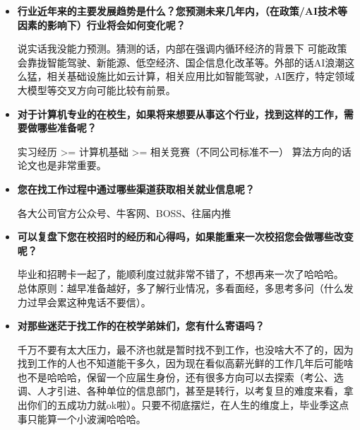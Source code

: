 \begin{itemize}
    \item \textbf{行业近年来的主要发展趋势是什么？您预测未来几年内，（在政策/AI技术等因素的影响下）行业将会如何变化呢？}

说实话我没能力预测。猜测的话，内部在强调内循环经济的背景下
可能政策会靠拢智能驾驶、新能源、低空经济、国企信息化改革等。外部的话AI浪潮这么猛，相关基础设施比如云计算，相关应用比如智能驾驶，AI医疗，特定领域大模型等交叉方向可能比较有前景。

    \item \textbf{对于计算机专业的在校生，如果将来想要从事这个行业，找到这样的工作，需要做哪些准备呢？}

实习经历 >= 计算机基础 >= 相关竞赛（不同公司标准不一）
算法方向的话论文也是非常重要。

    \item \textbf{您在找工作过程中通过哪些渠道获取相关就业信息呢？}

各大公司官方公众号、牛客网、BOSS、往届内推

    \item \textbf{可以复盘下您在校招时的经历和心得吗，如果能重来一次校招您会做哪些改变呢？}

毕业和招聘卡一起了，能顺利度过就非常不错了，不想再来一次了哈哈哈。
总体原则：越早准备越好，多了解行业情况，多看面经，多思考多问（什么发力过早会累这种鬼话不要信）。

    \item \textbf{对那些迷茫于找工作的在校学弟妹们，您有什么寄语吗？}

千万不要有太大压力，最不济也就是暂时找不到工作，也没啥大不了的，因为找到工作的人也不知道能干多久，因为现在看似高薪光鲜的工作几年后可能啥也不是哈哈哈，保留一个应届生身份，还有很多方向可以去探索（考公、选调、人才引进、各种单位的信息部门，甚至是转行，以考复旦的难度来看，拿出你们的五成功力就ok啦）。只要不彻底摆烂，在人生的维度上，毕业季这点事只能算一个小波澜哈哈哈。

\end{itemize}